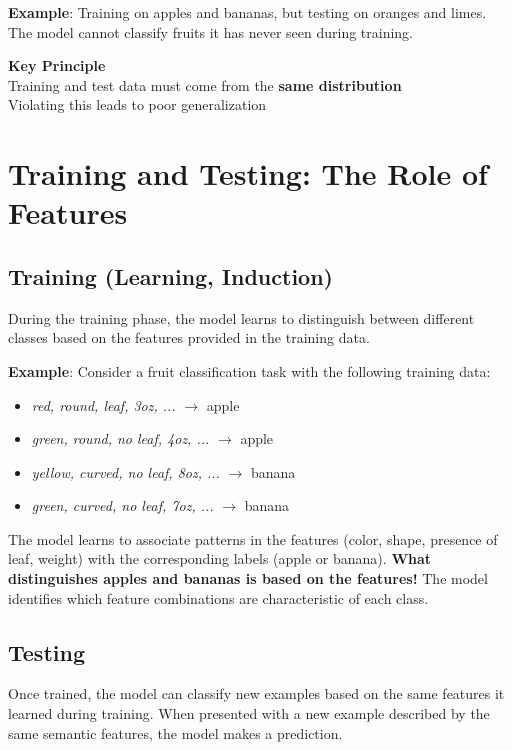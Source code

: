 \documentclass[11pt,a4paper]{article}
\theoremstyle{definition}
\theoremstyle{plain}
\theoremstyle{remark}
\begin{document}
\textbf{Example}: Training on apples and bananas, but testing on oranges and limes. The model cannot classify fruits it has never seen during training.

\begin{center}
\colorbox{orange!15}{\parbox{0.9\textwidth}{
\centering
\textbf{Key Principle}\\[0.2cm]
Training and test data must come from the \textbf{same distribution}\\[0.1cm]
Violating this leads to poor generalization
}}
\end{center}

\section{Training and Testing: The Role of Features}

\subsection{Training (Learning, Induction)}

During the training phase, the model learns to distinguish between different classes based on the features provided in the training data. 

\textbf{Example}: Consider a fruit classification task with the following training data:
\begin{itemize}
    \item \textit{red, round, leaf, 3oz, ...} $\rightarrow$ apple
    \item \textit{green, round, no leaf, 4oz, ...} $\rightarrow$ apple
    \item \textit{yellow, curved, no leaf, 8oz, ...} $\rightarrow$ banana
    \item \textit{green, curved, no leaf, 7oz, ...} $\rightarrow$ banana
\end{itemize}

The model learns to associate patterns in the features (color, shape, presence of leaf, weight) with the corresponding labels (apple or banana). \textbf{What distinguishes apples and bananas is based on the features!} The model identifies which feature combinations are characteristic of each class.

\subsection{Testing}

Once trained, the model can classify new examples based on the same features it learned during training. When presented with a new example described by the same semantic features, the model makes a prediction.
\end{document}
